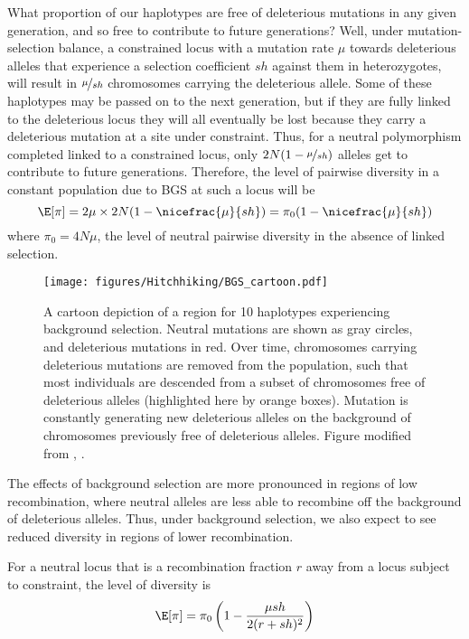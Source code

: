 What proportion of our haplotypes are free of
deleterious mutations in any given generation, and so free to
contribute to future generations? Well, under mutation-selection
balance, a constrained locus with a mutation rate $\mu$ towards
deleterious alleles that experience a selection coefficient $sh$
against them in heterozygotes, will result in $\nicefrac{\mu}{sh}$
chromosomes carrying the deleterious allele. Some of these haplotypes may be passed on to the next generation, but if they are fully linked to the deleterious locus they will all eventually be lost because they carry a deleterious mutation at a site under constraint. Thus, for a neutral polymorphism
completed linked to a constrained locus, only
$2N(1-\nicefrac{\mu}{sh})$ alleles get to contribute to future
generations. Therefore, the level of pairwise diversity in a constant
population due to BGS at such a locus will be
\begin{equation}
\E[\pi] = 2 \mu \times 2N(1-\nicefrac{\mu}{sh}) = \pi_0  (1-\nicefrac{\mu}{sh})
\end{equation}
where $\pi_0= 4N\mu$, the level of neutral pairwise diversity in the
absence of linked selection.

\begin{figure}
\begin{center}
\texttt{[image: figures/Hitchhiking/BGS\_cartoon.pdf]}
\end{center}
\caption{A cartoon depiction of a region for 10 haplotypes
  experiencing background selection. Neutral mutations are shown as
  gray circles, and deleterious mutations in red. Over time,
  chromosomes carrying deleterious mutations are removed from the
  population, such that most individuals are descended from a subset of
  chromosomes free of deleterious alleles (highlighted here by orange boxes). Mutation is constantly generating new deleterious alleles on
  the background of chromosomes previously free of deleterious
  alleles. Figure modified from \citet{sella2009pervasive}, \PLOSccBY.} \label{fig:BGS_cartoon}
\end{figure}
The effects of background selection are more pronounced in regions of low recombination, where
neutral alleles are less able to recombine off the background of deleterious
alleles. Thus, under background selection, we also expect to see
reduced diversity in regions of lower recombination. 

For a neutral locus that is a recombination fraction $r$ away from a
locus subject to constraint, the level of diversity is
\begin{equation}
\E[\pi] = \pi_0  \left(1-\frac{\mu sh}{2(r+sh)^2} \right) \label{eqn:pi_loc_BGS_1}
\end{equation}


